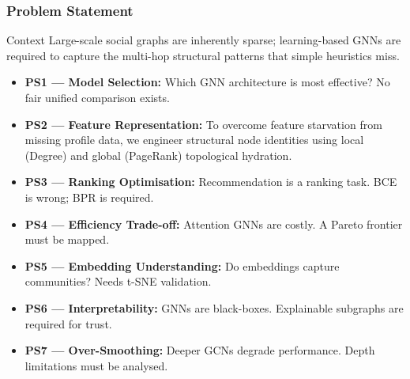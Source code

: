 \documentclass[10pt,aspectratio=43]{beamer}
\begin{document}
\begin{frame}
\frametitle{Problem Statement}
\begin{block}{Context}
  \small Large-scale social graphs are inherently sparse;
  learning-based GNNs are required to capture the multi-hop structural patterns that simple heuristics miss.
\end{block}

\vspace{-0.2em}
\begin{itemize}
  \small
  \item \alert{\textbf{PS1 --- Model Selection:}} Which GNN architecture is most effective? No fair unified comparison exists.
  \item \alert{\textbf{PS2 --- Feature Representation:}} To overcome feature starvation from missing profile data, we engineer structural node identities using local (Degree) and global (PageRank) topological hydration.
  \item \alert{\textbf{PS3 --- Ranking Optimisation:}} Recommendation is a ranking task. BCE is wrong; BPR is required.
  \item \alert{\textbf{PS4 --- Efficiency Trade-off:}} Attention GNNs are costly. A Pareto frontier must be mapped.
  \item \alert{\textbf{PS5 --- Embedding Understanding:}} Do embeddings capture communities? Needs t-SNE validation.
  \item \alert{\textbf{PS6 --- Interpretability:}} GNNs are black-boxes. Explainable subgraphs are required for trust.
  \item \alert{\textbf{PS7 --- Over-Smoothing:}} Deeper GCNs degrade performance. Depth limitations must be analysed.
\end{itemize}
\end{frame}
\end{document}
